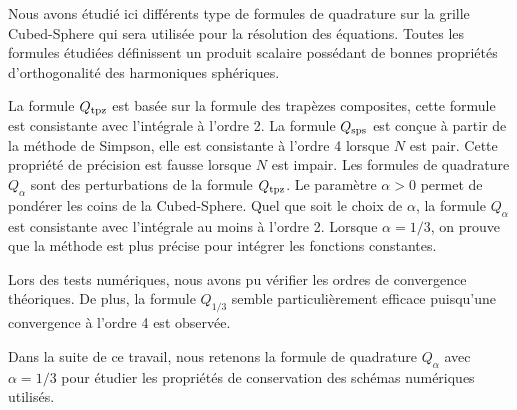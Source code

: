 Nous avons étudié ici différents type de formules de quadrature sur la grille Cubed-Sphere qui sera utilisée pour la résolution des équations. Toutes les formules étudiées définissent un produit scalaire possédant de bonnes propriétés d'orthogonalité des harmoniques sphériques.

La formule $Q_{\text{tpz}}$ est basée sur la formule des trapèzes composites, cette formule est consistante avec l'intégrale à l'ordre 2. La formule $Q_{\text{sps}}$ est conçue à partir de la méthode de Simpson, elle est consistante à l'ordre 4 lorsque $N$ est pair. Cette propriété de précision est fausse lorsque $N$ est impair.
Les formules de quadrature $Q_{\alpha}$ sont des perturbations de la formule $Q_{\text{tpz}}$. Le paramètre $\alpha>0$ permet de pondérer les coins de la Cubed-Sphere. Quel que soit le choix de $\alpha$, la formule $Q_{\alpha}$ est consistante avec l'intégrale au moins à l'ordre 2. Lorsque $\alpha = 1/3$, on prouve que la méthode est plus précise pour intégrer les fonctions constantes.

Lors des tests numériques, nous avons pu vérifier les ordres de convergence théoriques. De plus, la formule $Q_{1/3}$ semble particulièrement efficace puisqu'une convergence à l'ordre 4 est observée.

Dans la suite de ce travail, nous retenons la formule de quadrature $Q_{\alpha}$ avec $\alpha = 1/3$ pour étudier les propriétés de conservation des schémas numériques utilisés.


















